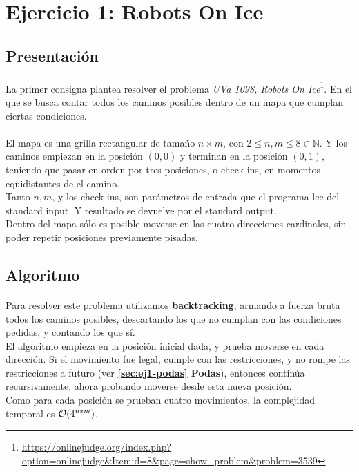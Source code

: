 \documentclass[./main.tex]{subfiles}
\begin{document}
\section{Ejercicio 1: Robots On Ice}
\label{sec:ej1}

\subsection{Presentación}
\label{sec:ej1-intro}

\paragraph{} La primer consigna plantea resolver el problema \textit{UVa 1098, Robots On Ice}\footnote{\url{https://onlinejudge.org/index.php?option=onlinejudge&Itemid=8&page=show_problem&problem=3539}}. En el que se busca contar todos los caminos posibles dentro de un mapa que cumplan ciertas condiciones.

\paragraph{} El mapa es una grilla rectangular de tamaño \(n \times m\), con \(2 \leq n, m \leq 8 \in \mathbb{N}\). Y los caminos empiezan en la posición \((0, 0)\) y terminan en la posición \((0, 1)\), teniendo que pasar en orden por tres posiciones, o check-ins, en momentos equidistantes de el camino. \\
Tanto \(n, m\), y los check-ins, son parámetros de entrada que el programa lee del standard input. Y resultado se devuelve por el standard output. \\
\indent Dentro del mapa sólo es posible moverse en las cuatro direcciones cardinales, sin poder repetir posiciones previamente pisadas.

\subsection{Algoritmo}
\label{sec:ej1-algo}

\paragraph{} Para resolver este problema utilizamos \textbf{backtracking}, armando a fuerza bruta todos los caminos posibles, descartando los que no cumplan con las condiciones pedidas, y contando los que sí. \\
\indent El algoritmo empieza en la posición inicial dada, y prueba moverse en cada dirección. Si el movimiento fue legal, cumple con las restricciones, y no rompe las restricciones a futuro (ver \textbf{\ref{sec:ej1-podas} Podas}), entonces continúa recursivamente, ahora probando moverse desde esta nueva posición. \\
\indent Como para cada posición se prueban cuatro movimientos, la complejidad temporal es \(\mathcal{O}(4^{n*m})\).
\end{document}
